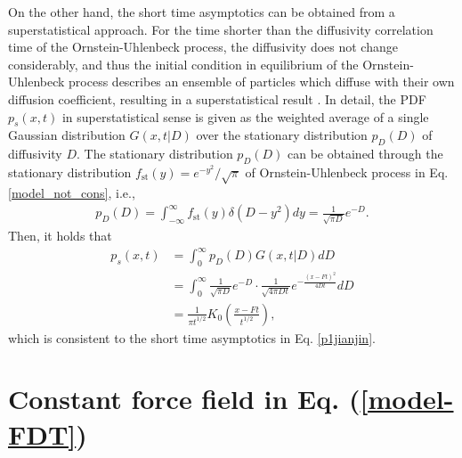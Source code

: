 \documentclass[aps,pre,twocolumn,groupedaddress,longbibliography]{revtex4-2}
\begin{document}
On the other hand, the short time asymptotics can be obtained from a superstatistical approach. For the time shorter than the diffusivity correlation time of the Ornstein-Uhlenbeck process, the diffusivity does not change considerably, and thus the initial condition in equilibrium of the Ornstein-Uhlenbeck process describes an ensemble of particles which diffuse with their own diffusion coefficient, resulting in a superstatistical result \cite{ChechkinSenoMetzlerSokolov:2017}.
In detail, the PDF $p_s(x,t)$ in superstatistical sense is given as the weighted average of a single Gaussian distribution $G(x,t|D)$ over the stationary distribution $p_D(D)$ of diffusivity $D$. The stationary distribution $p_D(D)$ can be obtained through the stationary distribution $f_{\textrm{st}}(y)=e^{-y^2}/\sqrt{\pi}$ of Ornstein-Uhlenbeck process in Eq. \eqref{model_not_cons}, i.e., \cite{ChechkinSenoMetzlerSokolov:2017}
\begin{equation}
\begin{split}
    p_D(D)=\int_{-\infty}^\infty f_{\textrm{st}}(y)\delta(D-y^2)dy
    =\frac{1}{\sqrt{\pi D}}e^{-D}.
\end{split}
\end{equation}
Then, it holds that
\begin{equation}
\begin{split}
p_s(x,t)&=\int_0^\infty p_D(D)G(x,t|D)dD  \\
&=\int_0^\infty \frac{1}{\sqrt{\pi D}}e^{-D} \cdot\frac{1}{\sqrt{4\pi Dt}}e^{-\frac{(x-Ft)^2}{4Dt}}dD \\
&=\frac{1}{\pi t^{1/2}}K_0\left(\frac{x-Ft}{t^{1/2}}\right),
\end{split}
\end{equation}
which is consistent to the short time asymptotics in Eq. \eqref{p1jianjin}.


\section{Constant force field in Eq. (\ref{model-FDT})}\label{Sec5}
\end{document}
